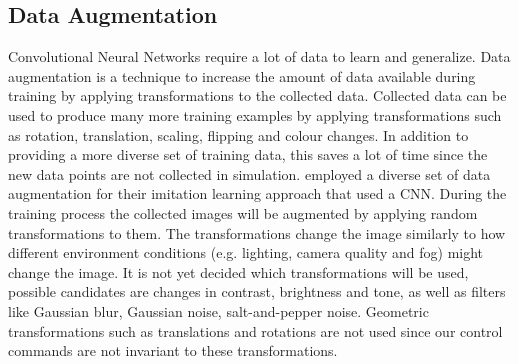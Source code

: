 \subsection*{Data Augmentation}
Convolutional Neural Networks require a lot of data to learn and generalize. Data augmentation is a technique to increase the amount of data available during training by applying transformations to the collected data. Collected data can be used to produce many more training examples by applying transformations such as rotation, translation, scaling, flipping and colour changes. In addition to providing a more diverse set of training data, this saves a lot of time since the new data points are not collected in simulation. \autocite{conditional_imitation_learning} employed a diverse set of data augmentation for their imitation learning approach that used a CNN.
During the training process the collected images will be augmented by applying random transformations to them. The transformations change the image similarly to how different environment conditions (e.g. lighting, camera quality and fog) might change the image. It is not yet decided which transformations will be used, possible candidates are changes in contrast, brightness and tone, as well as filters like Gaussian blur, Gaussian noise, salt-and-pepper noise.
Geometric transformations such as translations and rotations are not used since our control commands are not invariant to these transformations.


